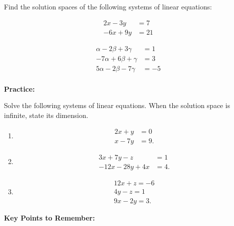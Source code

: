 \documentclass{article}
\begin{document}
Find the solution spaces of the following systems of linear equations:\medskip

\begin{align*}
	2x-3y&=7\\
	-6x+9y&=21
\end{align*}

\vfill

\begin{align*}
	\alpha-2\beta+3\gamma &=1\\
	-7\alpha+6\beta + \gamma &=3\\
	5\alpha-2\beta -7\gamma &=-5\\
\end{align*}

\vfill

\clearpage


\textbf{Practice:}\bigskip


Solve the following systems of linear equations. When the solution space is infinite, state its dimension.\medskip

\begin{enumerate}
	\item
		\begin{align*}
			2x + y &=0\\
			x-7y &=9.
		\end{align*}
	\item
		\begin{align*}
			3x+7y-z&=1\\
			-12x-28y+4x&=4.
		\end{align*}
	\item
		\begin{align*}
			12x +z = -6\\
			4y-z=1\\
			9x-2y=3.
		\end{align*}
\end{enumerate}



\clearpage


\textbf{Key Points to Remember:}\bigskip
\end{document}
